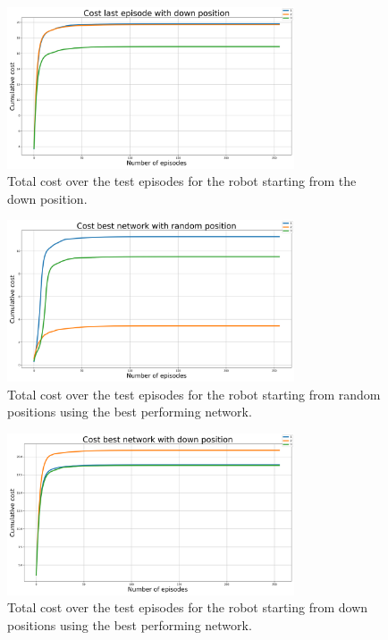 \documentclass[twocolumn, a4paper]{article}
\begin{document}
\begin{figure}[H]
	\centering
	\includegraphics[width=8.5cm]{"../Figures/loss_last_ep_down_positions_2J_500E_256EL.png"}
	\caption{Total cost over the test episodes for the robot starting
			 from the down position.}
\end{figure}
\vspace{-0.5cm}
\label{fig:Test_2_best_random_pos}
\begin{figure}[H]
	\centering
	\includegraphics[width=8.5cm]{"../Figures/loss_best_net_random_positions_2J_500E_256EL.png"}
	\caption{Total cost over the test episodes for the robot starting from
			 random positions using the best performing network.}
\end{figure}
\vspace{-0.5cm}
\label{fig:Test_2_best_down_pos}
\begin{figure}[H]
	\centering
	\includegraphics[width=8.5cm]{"../Figures/loss_best_net_down_positions_2J_500E_256EL.png"}
	\caption{Total cost over the test episodes for the robot starting from
			 down positions using the best performing network.}
\end{figure}
\end{document}

